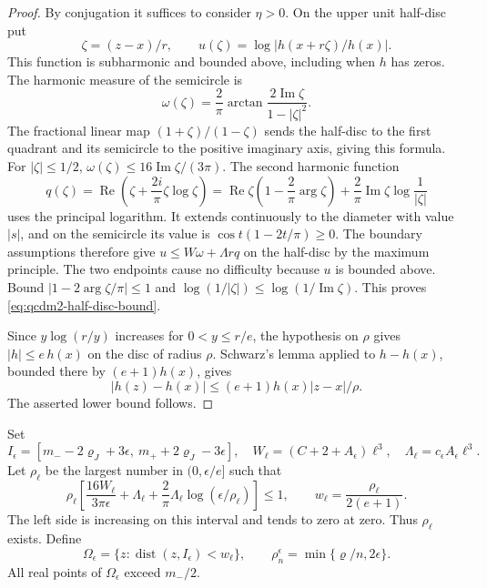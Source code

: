 \documentclass[11pt,letterpaper,reqno]{amsart}
\theoremstyle{definition}
\theoremstyle{remark}
\begin{document}
\begin{proof}
By conjugation it suffices to consider \(\eta>0\).
On the upper unit half-disc put
\[
 \zeta=(z-x)/r,\qquad
 u(\zeta)=\log|h(x+r\zeta)/h(x)|.
\]
This function is subharmonic and bounded above, including
when \(h\) has zeros. The harmonic measure of the semicircle is
\[
 \omega(\zeta)=\frac2\pi
       \arctan\frac{2\operatorname{Im}\zeta}{1-|\zeta|^2}.
\]
The fractional linear map \((1+\zeta)/(1-\zeta)\) sends the
half-disc to the first quadrant and its semicircle to the
positive imaginary axis, giving this formula. For
\(|\zeta|\le1/2\),
\(\omega(\zeta)\le16\operatorname{Im}\zeta/(3\pi)\).
The second harmonic function
\[
 q(\zeta)=\operatorname{Re}
       \left(\zeta+\frac{2i}{\pi}\zeta\log\zeta\right)
 =\operatorname{Re}\zeta
       \left(1-\frac2\pi\arg\zeta\right)
       +\frac2\pi\operatorname{Im}\zeta\log\frac1{|\zeta|}
\]
uses the principal logarithm. It extends continuously to the
diameter with value \(|s|\), and on the semicircle its value
is \(\cos t(1-2t/\pi)\ge0\).
The boundary assumptions therefore give
\(u\le W\omega+\Lambda r q\) on the half-disc by the
maximum principle. The two endpoints cause no difficulty
because \(u\) is bounded above. Bound
\(|1-2\arg\zeta/\pi|\le1\) and
\(\log(1/|\zeta|)\le\log(1/\operatorname{Im}\zeta)\).
This proves \eqref{eq:qcdm2-half-disc-bound}.

Since \(y\log(r/y)\) increases for \(0<y\le r/e\),
the hypothesis on \(\rho\) gives
\(|h|\le e\,h(x)\) on the disc of radius \(\rho\).
Schwarz's lemma applied to \(h-h(x)\), bounded there by
\((e+1)h(x)\), gives
\[
 |h(z)-h(x)|\le(e+1)h(x)|z-x|/\rho.
\]
The asserted lower bound follows.
\end{proof}

Set
\[
 I_\epsilon=[m_--2\varrho_J+3\epsilon,\
                         m_++2\varrho_J-3\epsilon],
 \quad W_\ell=(C+2+A_\epsilon)\ell^3,\quad
 \Lambda_\ell=c_\epsilon A_\epsilon\ell^3.
\]
Let \(\rho_\ell\) be the largest number in \((0,\epsilon/e]\)
such that
\begin{equation}\label{eq:qcdm2-mass-width}
 \rho_\ell\left[\frac{16W_\ell}{3\pi\epsilon}
       +\Lambda_\ell+
          \frac2\pi\Lambda_\ell\log(\epsilon/\rho_\ell)\right]
       \le1,
 \qquad w_\ell=\frac{\rho_\ell}{2(e+1)}.
\end{equation}
The left side is increasing on this interval and tends to zero
at zero. Thus \(\rho_\ell\) exists. Define
\[
 \Omega_\epsilon=\{z:\operatorname{dist}(z,I_\epsilon)<w_\ell\},
 \qquad \rho_n^\epsilon=\min\{\varrho/n,2\epsilon\}.
\]
All real points of \(\Omega_\epsilon\) exceed \(m_-/2\).
\end{document}
